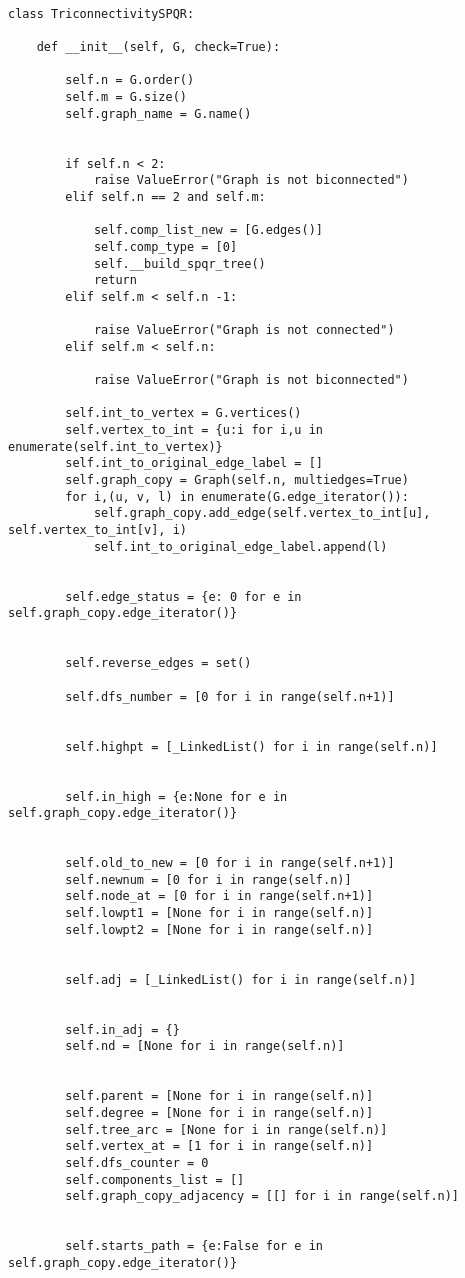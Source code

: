 \begin{verbatim}

class TriconnectivitySPQR:

	def __init__(self, G, check=True):

		self.n = G.order()
		self.m = G.size()
		self.graph_name = G.name()


		if self.n < 2:
			raise ValueError("Graph is not biconnected")
		elif self.n == 2 and self.m:

			self.comp_list_new = [G.edges()]
			self.comp_type = [0]
			self.__build_spqr_tree()
			return
		elif self.m < self.n -1:

			raise ValueError("Graph is not connected")
		elif self.m < self.n:

			raise ValueError("Graph is not biconnected")

		self.int_to_vertex = G.vertices()
		self.vertex_to_int = {u:i for i,u in enumerate(self.int_to_vertex)}
		self.int_to_original_edge_label = []
		self.graph_copy = Graph(self.n, multiedges=True)
		for i,(u, v, l) in enumerate(G.edge_iterator()):
			self.graph_copy.add_edge(self.vertex_to_int[u], self.vertex_to_int[v], i)
			self.int_to_original_edge_label.append(l)


		self.edge_status = {e: 0 for e in self.graph_copy.edge_iterator()}


		self.reverse_edges = set()

		self.dfs_number = [0 for i in range(self.n+1)]


		self.highpt = [_LinkedList() for i in range(self.n)]


		self.in_high = {e:None for e in self.graph_copy.edge_iterator()}


		self.old_to_new = [0 for i in range(self.n+1)]
		self.newnum = [0 for i in range(self.n)]
		self.node_at = [0 for i in range(self.n+1)]
		self.lowpt1 = [None for i in range(self.n)]
		self.lowpt2 = [None for i in range(self.n)]


		self.adj = [_LinkedList() for i in range(self.n)]


		self.in_adj = {}
		self.nd = [None for i in range(self.n)]


		self.parent = [None for i in range(self.n)]
		self.degree = [None for i in range(self.n)]
		self.tree_arc = [None for i in range(self.n)]
		self.vertex_at = [1 for i in range(self.n)]
		self.dfs_counter = 0
		self.components_list = []
		self.graph_copy_adjacency = [[] for i in range(self.n)]


		self.starts_path = {e:False for e in self.graph_copy.edge_iterator()}


\end{verbatim}

